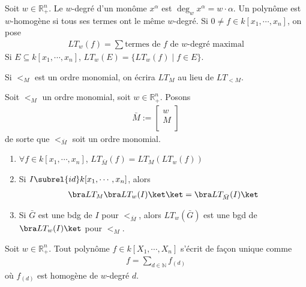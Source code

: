         \begin{defi}
            Soit $w \in \mathbb{R}^n_+$. Le $w$-degré d'un monôme $x^\alpha$ est $\deg_w x^\alpha = w \cdot \alpha$. Un polynôme est $w$-homogène si tous ses termes ont le même $w$-degré. Si $0 \neq f \in k[x_1, \cdots, x_n]$, on pose 
            \begin{align*}
                LT_w(f) = \sum \text{termes de $f$ de $w$-degré maximal}
            \end{align*}
            Si $E \subseteq k[x_1, \cdots, x_n]$, $LT_w(E) = \{LT_w(f) \mid f \in E\}$.
        \end{defi}
        \begin{nota}
            Si $<_M$ est un ordre monomial, on écrira $LT_M$ au lieu de $LT_{<M}$.
        \end{nota}
        \begin{prop}
            \label{prop331}
            Soit $<_M$ un ordre monomial, soit $w \in \mathbb{R}_+^n$. Posons
            \begin{align*}
                \bar M :=
                \begin{bmatrix}
                    w \\
                    M \\
                \end{bmatrix}
            \end{align*}
            de sorte que $<_{\bar M}$ soit un ordre monomial.
            \begin{enumerate}
                \item $\forall f \in k[x_1, \cdots, x_n]$, $LT_{\bar M}(f) = LT_M(LT_w(f))$
                \item Si $I \subrel{id} k[x_1, \cdots, x_n]$, alors
                \begin{align*}
                    \bra LT_M \bra LT_w(I) \ket \ket = \bra LT_{\bar M}(I) \ket
                \end{align*}
                \item Si $\bar G$ est une bdg de $I$ pour $<_{\bar M}$, alors $LT_w(\bar G)$ est une bgd de $\bra LT_w(I) \ket$ pour $<_M$.
            \end{enumerate}
        \end{prop}
        \begin{lemm}
            Soit $w \in \mathbb{R}_+^n$. Tout polynôme $f \in k[X_1, \cdots, X_n]$ s'écrit de façon unique comme 
            \begin{align*}
                f = \sum_{d \in \mathbb{N}} f_{(d)}
            \end{align*}
            où $f_{(d)}$ est homogène de $w$-degré $d$.
        \end{lemm}
